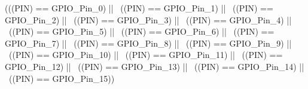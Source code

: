 \begin{DoxyCode}
(((PIN) == GPIO_Pin_0) || \
                              ((PIN) == GPIO_Pin_1) || \
                              ((PIN) == GPIO_Pin_2) || \
                              ((PIN) == GPIO_Pin_3) || \
                              ((PIN) == GPIO_Pin_4) || \
                              ((PIN) == GPIO_Pin_5) || \
                              ((PIN) == GPIO_Pin_6) || \
                              ((PIN) == GPIO_Pin_7) || \
                              ((PIN) == GPIO_Pin_8) || \
                              ((PIN) == GPIO_Pin_9) || \
                              ((PIN) == GPIO_Pin_10) || \
                              ((PIN) == GPIO_Pin_11) || \
                              ((PIN) == GPIO_Pin_12) || \
                              ((PIN) == GPIO_Pin_13) || \
                              ((PIN) == GPIO_Pin_14) || \
                              ((PIN) == GPIO_Pin_15))
\end{DoxyCode}
